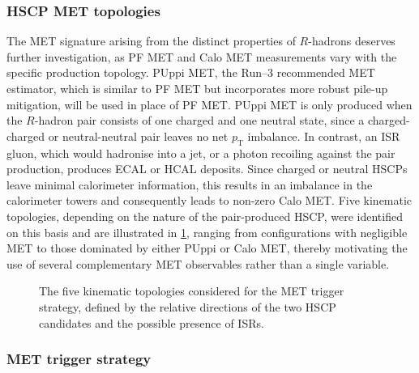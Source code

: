 \subsubsection{HSCP MET topologies}

The MET signature arising from the distinct properties of $R$-hadrons deserves further investigation, as PF MET and Calo MET measurements vary with the specific production topology. PUppi MET, the Run--3 recommended MET estimator, which is similar to PF MET but incorporates more robust pile-up mitigation, will be used in place of PF MET. PUppi MET is only produced when the $R$-hadron pair consists of one charged and one neutral state, since a charged-charged or neutral-neutral pair leaves no net $p_{\mathrm{T}}$ imbalance. In contrast, an ISR gluon, which would hadronise into a jet, or a photon recoiling against the pair production, produces ECAL or HCAL deposits. Since charged or neutral HSCPs leave minimal calorimeter information, this results in an imbalance in the calorimeter towers and consequently leads to non-zero Calo MET. Five kinematic topologies, depending on the nature of the pair-produced HSCP, were identified on this basis and are illustrated in \cref{fig:METtopology}, ranging from configurations with negligible MET to those dominated by either PUppi or Calo MET, thereby motivating the use of several complementary MET observables rather than a single variable.

\begin{figure}[htbp!]
    \centering
    
    \caption{The five kinematic topologies considered for the MET trigger strategy, defined by the relative directions of the two HSCP candidates and the possible presence of ISRs.}
    \label{fig:METtopology}
\end{figure}


\subsubsection{MET trigger strategy}

